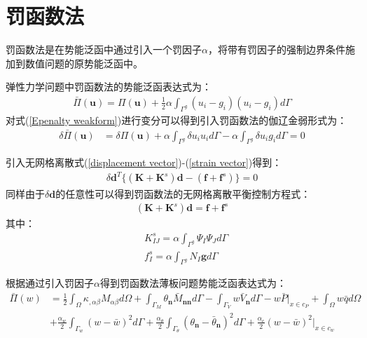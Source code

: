 \section{罚函数法}
罚函数法\cite{}是在势能泛函中通过引入一个罚因子$\alpha$，将带有罚因子的强制边界条件施加到数值问题的原势能泛函中。\par
弹性力学问题中罚函数法的势能泛函表达式为：
\begin{equation}\label{Epenalty weakform}
\begin{split}
    \bar{\Pi}(\pmb{u})=\Pi(\pmb{u})+\frac{1}{2}\alpha\int_{\Gamma^g}(u_i-g_i)(u_i-g_i)d\Gamma
\end{split}
\end{equation}
对式(\ref{Epenalty weakform})进行变分可以得到引入罚函数法的伽辽金弱形式为：
\begin{equation}
\begin{split}
    \delta\bar{\Pi}(\pmb{u})&=\delta\Pi(\pmb{u})+\alpha\int_{\Gamma^g}\delta u_iu_id\Gamma-\alpha\int_{\Gamma^g}\delta u_ig_id\Gamma
    =0
\end{split}                                                 
\end{equation}\par
引入无网格离散式(\ref{displacement vector})-(\ref{strain vector})得到：
\begin{equation}
\begin{split}
      \delta\pmb{d}^T\{(\pmb{K}+\pmb{K}^s)\pmb{d}-(\pmb{f}+\pmb{f}^s)\}=0
\end{split}                                                 
\end{equation}
同样由于$\delta\pmb{d}$的任意性可以得到罚函数法的无网格离散平衡控制方程式：
\begin{equation}
\begin{split}
    (\pmb{K}+\pmb{K}^s)\pmb{d}=\pmb{f}+\pmb{f}^s
\end{split}
\end{equation}
其中：
\begin{subequations}
\begin{align}
  &K^s_{IJ}=\alpha\int_{\Gamma^g}\Psi_I\Psi_Jd\Gamma\\
  &f^s_I=\alpha\int_{\Gamma^g}N_I\pmb{g}d\Gamma
\end{align}
\end{subequations}\par
根据\cite{}通过引入罚因子$\alpha$得到罚函数法薄板问题势能泛函表达式为：
\begin{equation}\label{Ppenalty}
\begin{split}
        \bar{\Pi}(w)&=\frac{1}{2}\int_{\Omega}\kappa_{,\alpha\beta}M_{\alpha\beta}d\Omega+\int_{\Gamma_M}\theta_{\pmb{n}}\bar{M}_{\pmb{nn}}d\Gamma-\int_{\Gamma_V}w\bar{V}_{\pmb{n}}d\Gamma-w\bar{P}\vert_{x\in c_P}+\int_{\Omega}w\bar{q}d\Omega\\
    &+\frac{\alpha_w}{2}\int_{\Gamma_w}(w-\bar{w})^2d\Gamma+\frac{\alpha_{\theta}}{2}\int_{\Gamma_{\theta}}(\theta_{\pmb{n}}-\bar{\theta}_{\pmb{n}})^2d\Gamma+\frac{\alpha_c}{2}(w-\bar{w})^2\vert_{x\in c_w}
\end{split}
\end{equation}
